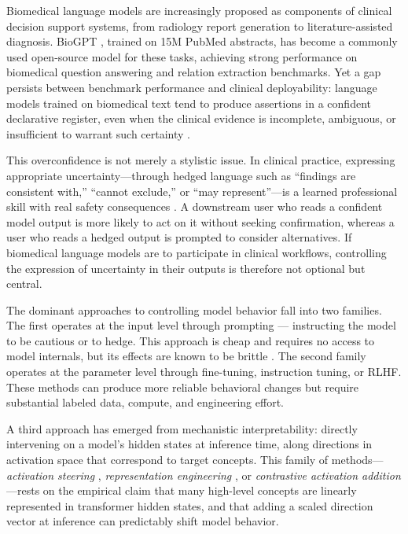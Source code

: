 \documentclass[11pt,a4paper]{article}
\begin{document}
Biomedical language models are increasingly proposed as components of
clinical decision support systems, from radiology report generation to
literature-assisted diagnosis. BioGPT \citep{luo2022biogpt}, trained on
15M PubMed abstracts, has become a commonly used open-source model for
these tasks, achieving strong performance on biomedical question
answering and relation extraction benchmarks. Yet a gap persists between
benchmark performance and clinical deployability: language models trained
on biomedical text tend to produce assertions in a confident declarative
register, even when the clinical evidence is incomplete, ambiguous, or
insufficient to warrant such certainty \citep{singhal2023medpalm,
umapathi2023medhalt}.

This overconfidence is not merely a stylistic issue. In clinical
practice, expressing appropriate uncertainty---through hedged language
such as ``findings are consistent with,'' ``cannot exclude,'' or ``may
represent''---is a learned professional skill with real safety
consequences \citep{panicek2016radiology}. A downstream user who reads a
confident model output is more likely to act on it without seeking
confirmation, whereas a user who reads a hedged output is prompted to
consider alternatives. If biomedical language models are to participate
in clinical workflows, controlling the expression of uncertainty in
their outputs is therefore not optional but central.

The dominant approaches to controlling model behavior fall into two
families. The first operates at the input level through prompting ---
instructing the model to be cautious or to hedge. This approach is cheap
and requires no access to model internals, but its effects are known to
be brittle \citep{zhao2021calibrate, lu2022order}. The second family
operates at the parameter level through fine-tuning, instruction tuning,
or RLHF. These methods can produce more reliable behavioral changes but
require substantial labeled data, compute, and engineering effort.

A third approach has emerged from mechanistic interpretability: directly
intervening on a model's hidden states at inference time, along
directions in activation space that correspond to target concepts. This
family of methods---\emph{activation steering}
\citep{turner2023activation}, \emph{representation engineering}
\citep{zou2023representation}, or \emph{contrastive activation addition}
\citep{panickssery2024steering}---rests on the empirical claim that many
high-level concepts are linearly represented in transformer hidden
states, and that adding a scaled direction vector at inference can
predictably shift model behavior.
\end{document}
